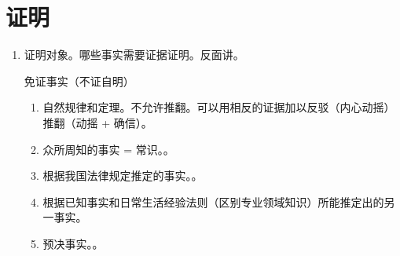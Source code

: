 \section{证明}
\begin{enumerate}
  \item 证明对象。哪些事实需要证据证明。反面讲。
        \begin{kk}{免证事实（不证自明）}
          \begin{enumerate}
            \item 自然规律和定理。不允许推翻。\xjt 可以用相反的证据加以反驳（内心动摇） \hz 推翻（动摇 + 确信）。
            \item 众所周知的事实 = 常识。。
            \item 根据我国法律规定推定的事实。。
            \item 根据已知事实和日常生活经验法则（区别专业领域知识）所能推定出的另一事实。
            \item 预决事实。。
          \end{enumerate}
        \end{kk}


\end{enumerate}
